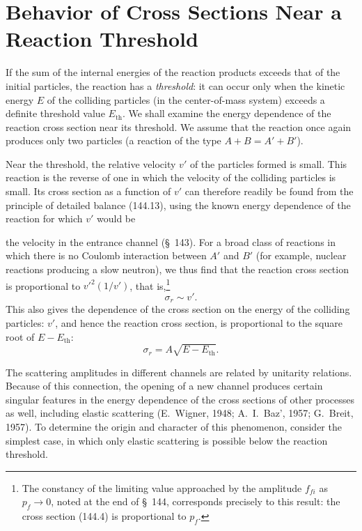 \section{Behavior of Cross Sections Near a Reaction Threshold}

If the sum of the internal energies of the reaction products exceeds that of the initial particles, the reaction has a \emph{threshold}: it can occur only when the kinetic energy $E$ of the colliding particles (in the center-of-mass system) exceeds a definite threshold value $E_{\mathrm{th}}$. We shall examine the energy dependence of the reaction cross section near its threshold. We assume that the reaction once again produces only two particles (a reaction of the type $A+B=A'+B'$).

Near the threshold, the relative velocity $v'$ of the particles formed is small. This reaction is the reverse of one in which the velocity of the colliding particles is small. Its cross section as a function of $v'$ can therefore readily be found from the principle of detailed balance (144.13), using the known energy dependence of the reaction for which $v'$ would be

the velocity in the entrance channel (\S~143). For a broad class of reactions in which there is no Coulomb interaction between $A'$ and $B'$ (for example, nuclear reactions producing a slow neutron), we thus find that the reaction cross section is proportional to $v'^2(1/v')$, that is,\footnote{The constancy of the limiting value approached by the amplitude $f_{fi}$ as $p_f\to0$, noted at the end of \S~144, corresponds precisely to this result: the cross section (144.4) is proportional to $p_f$.}
\begin{equation}
 \sigma_r\sim v'.
 \tag{147.1}
\end{equation}
This also gives the dependence of the cross section on the energy of the colliding particles: $v'$, and hence the reaction cross section, is proportional to the square root of $E-E_{\mathrm{th}}$:
\begin{equation}
 \sigma_r=A\sqrt{E-E_{\mathrm{th}}}.
 \tag{147.2}
\end{equation}

The scattering amplitudes in different channels are related by unitarity relations. Because of this connection, the opening of a new channel produces certain singular features in the energy dependence of the cross sections of other processes as well, including elastic scattering (E.~Wigner, 1948; A.~I.~Baz', 1957; G.~Breit, 1957). To determine the origin and character of this phenomenon, consider the simplest case, in which only elastic scattering is possible below the reaction threshold.

